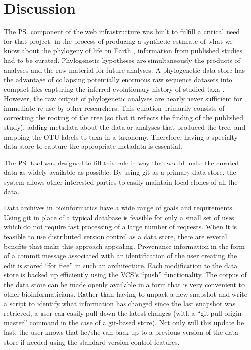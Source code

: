 \section{Discussion}
The \ps component of the \otol web infrastructure was built to fulfill a critical need for that
    project: in the process of producing a synthetic estimate of what we know about the phylogeny
    of life on Earth \citep{Smith2014}, information from published studies had to be curated.
Phylogenetic hypotheses are simultaneously the products of analyses and the raw material for future analyses.
A phylogenetic data store has the advantage of collapsing potentially enormous raw sequence datasets
into compact files capturing the inferred evolutionary history of studied taxa \citep{ane2005missing}.
However, the raw output of phylogenetic analyses are nearly never sufficient for immediate re-use by other researchers. 
This curation primarily consists of correcting the rooting of the tree (so that it reflects the finding of the published study), adding metadata about the data
    or analyses that produced the tree, and mapping the OTU labels to taxa in a taxonomy.
Therefore, having a specialty data store to capture the appropriate metadata is essential.

The \ps tool was designed to fill this role in way that would make the curated data as widely available
    as possible.
By using git as a primary data store, the system allows other interested parties to easily maintain
    local clones of all the data.

Data archives in bioinformatics have a wide range of goals and requirements.
Using git in place of a typical database is feasible for only a small set of uses which do not require
    fast processing of a large number of requests.
When it is feasible to use distributed version control as a data store, there are several benefits
    that make this approach appealing.
Provenance information in the form of a commit message associated with an identification of the 
    user creating the edit is stored ``for free'' in such an architecture.
Each modification to the data store is backed up efficiently using the VCS's ``push'' functionality.
The corpus of the data store can be made openly available in a form that is very convenient to
    other bioinformaticians.
Rather than having to unpack a new snapshot and write a script to identify
    what information has changed since the last snapshot was retrieved, a user can easily pull down
    the latest changes (with a ``git pull origin master'' command in the case of a git-based store).
Not only will this update be fast, the user knows that he/she can back up to a previous version of the 
    data store if needed using the standard version control features.

